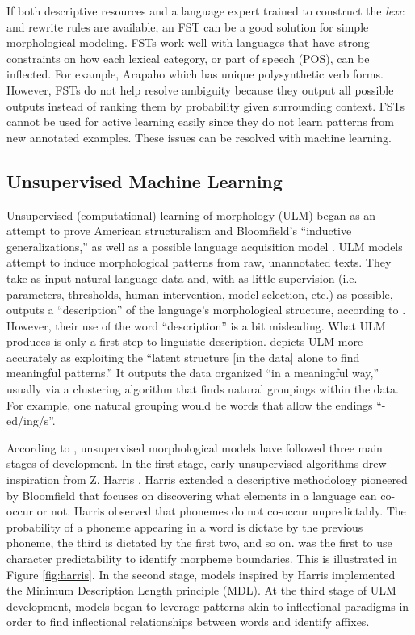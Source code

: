 \documentclass[12pt]{article}
\begin{document}
If both descriptive resources and a language expert trained to construct the \textit{lexc} and rewrite rules are available, an FST can be a good solution for simple morphological modeling. FSTs work well with languages that have strong constraints on how each lexical category, or part of speech (POS), can be inflected. For example, Arapaho which has unique polysynthetic verb forms. However, FSTs do not help resolve ambiguity because they output all possible outputs instead of ranking them by probability given surrounding context. FSTs cannot be used for active learning easily since they do not learn patterns from new annotated examples. These issues can be resolved with machine learning. 

\subsection{Unsupervised Machine Learning}

Unsupervised (computational) learning of morphology (ULM) began as an attempt to prove American structuralism and Bloomfield's ``inductive generalizations,'' as well as a possible language acquisition model \cite{hammarstrom_unsupervised_2011}. ULM models attempt to induce morphological patterns from raw, unannotated texts. They take as input natural language data and, with as little supervision (i.e. parameters, thresholds, human intervention, model selection, etc.) as possible, outputs a ``description'' of the language’s morphological structure, according to . However, their use of the word “description” is a bit misleading. What ULM produces is only a first step to linguistic description.  depicts ULM more accurately as exploiting the ``latent structure [in the data] alone to find meaningful patterns.'' It outputs the data organized ``in a meaningful way,'' usually via a clustering algorithm that finds natural groupings within the data. For example, one natural grouping would be words that allow the endings ``-ed/ing/s''.

According to , unsupervised morphological models have followed three main stages of development. In the first stage, early unsupervised algorithms drew inspiration from Z. Harris \cite{harris_phoneme_1955,harris_morpheme_1967}. Harris extended a descriptive methodology pioneered by Bloomfield that focuses on discovering what elements in a language can co-occur or not. Harris observed that phonemes do not co-occur unpredictably. The probability of a phoneme appearing in a word is dictate by the previous phoneme, the third is dictated by the first two, and so on.  was the first to use character predictability to identify morpheme boundaries. This is illustrated in Figure \ref{fig:harris}. In the second stage, models inspired by Harris implemented the Minimum Description Length principle (MDL). At the third stage of ULM development, models began to leverage patterns akin to inflectional paradigms in order to find inflectional relationships between words and identify affixes.
\end{document}
